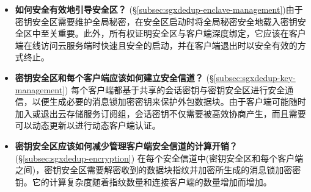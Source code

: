 \begin{itemize}
  \item \textbf{如何安全有效地引导安全区？} (\S\ref{subsec:sgxdedup-enclave-management})由于密钥安全区需要维护全局秘密，在安全区启动时将全局秘密安全地载入密钥安全区中至关重要。此外，所有权证明安全区与客户端深度绑定，它应该在客户端在线访问云服务端时快速且安全的启动，并在客户端退出时以安全有效的方式终止。
  \item \textbf{密钥安全区和每个客户端应该如何建立安全信道？} (\S\ref{subsec:sgxdedup-key-management})
  每个客户端都基于共享的会话密钥与密钥安全区进行安全通信，以便生成必要的消息锁加密密钥来保护外包数据块。由于客户端可能随时加入或退出云存储服务订阅组，会话密钥不仅需要被高效协商产生，而且需要可以动态更新以进行动态客户端认证。
  \item \textbf{密钥安全区应该如何减少管理客户端安全信道的计算开销？} (\S\ref{subsec:sgxdedup-encryption})
  在每个安全信道中(密钥安全区和每个客户端之间)，密钥安全区需要解密收到的数据块指纹并加密所生成的消息锁加密密钥。它的计算复杂度随着指纹数量和连接客户端的数量增加而增加。
\end{itemize}
